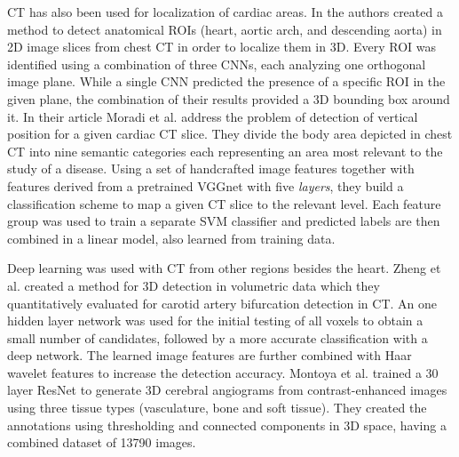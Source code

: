 \documentclass[journal]{IEEEtran}
\begin{document}
CT has also been used for localization of cardiac areas.
In\cite{de20162d} the authors created a method to detect anatomical ROIs (heart, aortic arch, and descending aorta) in 2D image slices from chest CT in order to localize them in 3D.
Every ROI was identified using a combination of three CNNs, each analyzing one orthogonal image plane.
While a single CNN predicted the presence of a specific ROI in the given plane, the combination of their results provided a 3D bounding box around it.
In their article Moradi et al.\cite{moradi2016hybrid} address the problem of detection of vertical position for a given cardiac CT slice.
They divide the body area depicted in chest CT into nine semantic categories each representing an area most relevant to the study of a disease.
Using a set of handcrafted image features together with features derived from a pretrained VGGnet with five \textit{layers}, they build a classification scheme to map a given CT slice to the relevant level.
Each feature group was used to train a separate SVM classifier and predicted labels are then combined in a linear model, also learned from training data.

Deep learning was used with CT from other regions besides the heart.
Zheng et al.\cite{zheng20153d} created a method for 3D detection in volumetric data which they quantitatively evaluated for carotid artery bifurcation detection in CT\@.
An one hidden layer network was used for the initial testing of all voxels to obtain a small number of candidates, followed by a more accurate classification with a deep network.
The learned image features are further combined with Haar wavelet features to increase the detection accuracy.
Montoya et al.\cite{montoya2018deep} trained a 30 layer ResNet to generate 3D cerebral angiograms from contrast-enhanced images using three tissue types (vasculature, bone and soft tissue).
They created the annotations using thresholding and connected components in 3D space, having a combined dataset of 13790 images.
\end{document}
